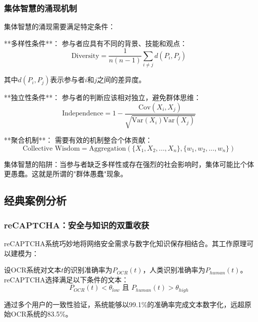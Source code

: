 \subsubsection{集体智慧的涌现机制} %

集体智慧的涌现需要满足特定条件：

**多样性条件**：
参与者应具有不同的背景、技能和观点：
\begin{equation}
\text{Diversity} = \frac{1}{n(n-1)} \sum_{i \neq j} d(P_i, P_j)
\end{equation}

其中$d(P_i, P_j)$表示参与者$i$和$j$之间的差异度。

**独立性条件**：
参与者的判断应该相对独立，避免群体思维：
\begin{equation}
\text{Independence} = 1 - \frac{\text{Cov}(X_i, X_j)}{\sqrt{\text{Var}(X_i)\text{Var}(X_j)}}
\end{equation}

**聚合机制**：
需要有效的机制整合个体贡献：
\begin{equation}
\text{Collective Wisdom} = \text{Aggregation}(\{X_1, X_2, ..., X_n\}, \{w_1, w_2, ..., w_n\})
\end{equation}

\begin{center}
集体智慧的陷阱：当参与者缺乏多样性或存在强烈的社会影响时，集体可能比个体更愚蠢。这就是所谓的"群体愚蠢"现象。
\end{center}

\subsection{经典案例分析}

\subsubsection{reCAPTCHA：安全与知识的双重收获}

reCAPTCHA系统巧妙地将网络安全需求与数字化知识保存相结合。其工作原理可以建模为：

设OCR系统对文本$t$的识别准确率为$P_{OCR}(t)$，人类识别准确率为$P_{human}(t)$。reCAPTCHA选择满足以下条件的文本：
\begin{equation}
P_{OCR}(t) < \theta_{low} \text{ 且 } P_{human}(t) > \theta_{high}
\end{equation}

通过多个用户的一致性验证，系统能够以99.1\%的准确率完成文本数字化，远超原始OCR系统的83.5\%。

